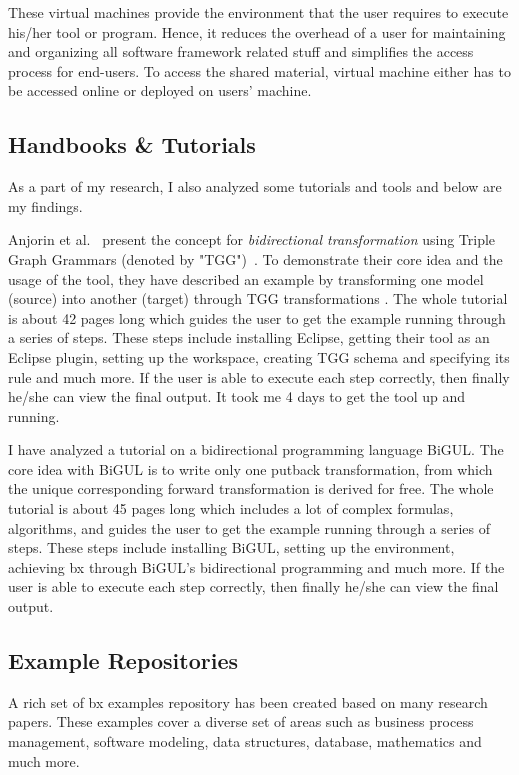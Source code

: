 These virtual machines provide the environment that the user requires to execute his/her tool or program. Hence, it reduces the overhead of a user for maintaining and organizing all software framework related stuff and simplifies the access process for end-users. To access the shared material, virtual machine either has to be accessed online or deployed on users' machine.

\subsection{Handbooks \& Tutorials}\label{subsec:handbook}
As a part of my research, I also analyzed some tutorials and tools and below are my findings.

Anjorin et al.~\cite{emoflon-part4} present the concept for \textit{bidirectional transformation} using Triple Graph Grammars (denoted by "TGG")~\cite{tgg}. To demonstrate their core idea and the usage of the tool, they have described an example by transforming one model (source) into another (target) through TGG transformations \cite{tgg}\cite{bx-tgg}. The whole tutorial is about 42 pages long which guides the user to get the example running through a series of steps. These steps include installing \ac{Eclipse}, getting their tool as an Eclipse plugin, setting up the workspace, creating TGG schema and specifying its rule and much more. If the user is able to execute each step correctly, then finally he/she can view the final output. It took me 4 days to get the tool up and running.

I have analyzed a tutorial\cite{bigul-tutorial} on a bidirectional programming language BiGUL\cite{bigul}. The core idea with BiGUL is to write only one putback transformation, from which the unique corresponding forward transformation is derived for free. The whole tutorial is about 45 pages long which includes a lot of complex formulas, algorithms, and guides the user to get the example running through a series of steps. These steps include installing BiGUL, setting up the environment, achieving bx through BiGUL's bidirectional programming and much more. If the user is able to execute each step correctly, then finally he/she can view the final output. 

\subsection{Example Repositories}\label{subsec:examplerep}
A rich set of bx examples repository \cite{bx-examples} has been created based on many research papers. These examples cover a diverse set of areas such as business process management, software modeling, data structures, database, mathematics and much more.

